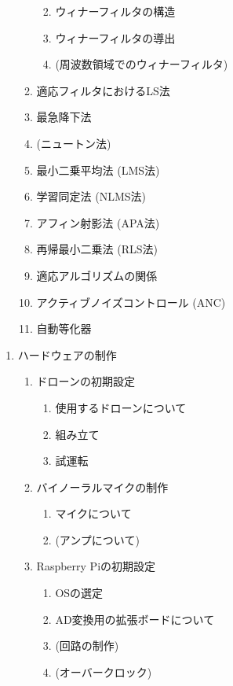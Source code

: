 \documentclass[
]{jsarticle}
\providecommand{\tightlist}{%
  \setlength{\itemsep}{0pt}\setlength{\parskip}{0pt}}
\begin{document}
\begin{enumerate}
\begin{enumerate}
    \begin{enumerate}
    \def\labelenumiii{\arabic{enumiii}.}
    \tightlist
    \item
      ウィナーフィルタの構造
    \item
      ウィナーフィルタの導出
    \item
      (周波数領域でのウィナーフィルタ)
    \end{enumerate}
  \item
    適応フィルタにおけるLS法
  \item
    最急降下法
  \item
    (ニュートン法)
  \item
    最小二乗平均法 (LMS法)
  \item
    学習同定法 (NLMS法)
  \item
    アフィン射影法 (APA法)
  \item
    再帰最小二乗法 (RLS法)
  \item
    適応アルゴリズムの関係
  \item
    アクティブノイズコントロール (ANC)
  \item
    自動等化器
  \end{enumerate}
\end{enumerate}

\begin{enumerate}
\def\labelenumi{\arabic{enumi}.}
\setcounter{enumi}{2}
\tightlist
\item
  ハードウェアの制作

  \begin{enumerate}
  \def\labelenumii{\arabic{enumii}.}
  \tightlist
  \item
    ドローンの初期設定

    \begin{enumerate}
    \def\labelenumiii{\arabic{enumiii}.}
    \tightlist
    \item
      使用するドローンについて
    \item
      組み立て
    \item
      試運転
    \end{enumerate}
  \item
    バイノーラルマイクの制作

    \begin{enumerate}
    \def\labelenumiii{\arabic{enumiii}.}
    \tightlist
    \item
      マイクについて
    \item
      (アンプについて)
    \end{enumerate}
  \item
    Raspberry Piの初期設定

    \begin{enumerate}
    \def\labelenumiii{\arabic{enumiii}.}
    \tightlist
    \item
      OSの選定
    \item
      AD変換用の拡張ボードについて
    \item
      (回路の制作)
    \item
      (オーバークロック)
    \end{enumerate}
  \end{enumerate}
\end{enumerate}
\end{document}
